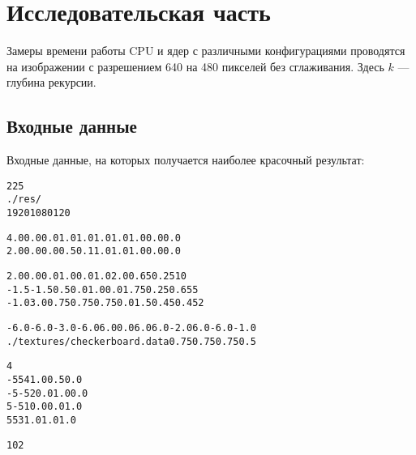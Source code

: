 \section{Исследовательская часть}
Замеры времени работы CPU и ядер с различными конфигурациями проводятся на изображении с разрешением 640 на 480 пикселей без сглаживания. Здесь $k$ --- глубина рекурсии.


\subsection{Входные данные}
Входные данные, на которых получается наиболее красочный результат:
\begin{alltt}
225
./res/%d.data
1920 1080 120

4.0 0.0 0.0   1.0 1.0   1.0 1.0 1.0   0.0 0.0
2.0 0.0 0.0   0.5 0.1   1.0 1.0 1.0   0.0 0.0

 2.0  0.0  0.0    1.0  0.0  1.0   2.0    0.65   0.25   10
-1.5 -1.5  0.5    0.0  1.0  0.0   1.75   0.25   0.65   5
-1.0  3.0  0.75   0.75 0.75 0.0   1.5    0.45   0.45   2

-6.0 -6.0 -3.0   -6.0  6.0  0.0   6.0 6.0 -2.0   6.0 -6.0 -1.0
./textures/checkerboard.data 0.75 0.75 0.75 0.5

4
-5  5 4     1.0 0.5 0.0
-5 -5 2     0.0 1.0 0.0
 5 -5 1     0.0 0.0 1.0
 5  5 3     1.0 1.0 1.0

10 2
\end{alltt}

